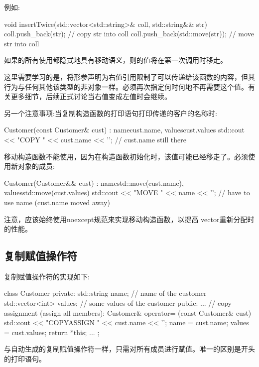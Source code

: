 例如:

\begin{cppcode}
void insertTwice(std::vector<std::string>& coll, std::string&& str)
{
	coll.push_back(str); // copy str into coll
	coll.push_back(std::move(str)); // move str into coll
}
\end{cppcode}

如果的所有使用都隐式地具有移动语义，则的值将在第一次调用时移走。

这里需要学习的是，将形参声明为右值引用限制了可以传递给该函数的内容，但其行为与任何其他该类型的非对象一样。必须再次指定何时何地不再需要这个值。有关更多细节，后续正式讨论当右值变成左值时会继续。

另一个注意事项:当复制构造函数的打印语句打印传递的客户的名称时:

\begin{cppcode}
Customer(const Customer& cust)
: name{cust.name}, values{cust.values} {
	std::cout << "COPY " << cust.name << '\n'; // cust.name still there
}
\end{cppcode}

移动构造函数不能使用，因为在构造函数初始化时，该值可能已经移走了。必须使用新对象的成员:

\begin{cppcode}
Customer(Customer&& cust)
: name{std::move(cust.name)}, values{std::move(cust.values)} {
	std::cout << "MOVE " << name << '\n'; // have to use name (cust.name moved away)
}
\end{cppcode}

注意，应该始终使用noexcept规范来实现移动构造函数，以提高 vector重新分配时的性能。

\subsection{复制赋值操作符}

复制赋值操作符的实现如下:

\begin{cppcode}
class Customer {
	private:
	std::string name; // name of the customer
	std::vector<int> values; // some values of the customer
	public:
	...
	// copy assignment (assign all members):
	Customer& operator= (const Customer& cust) {
		std::cout << "COPYASSIGN " << cust.name << '\n';
		name = cust.name;
		values = cust.values;
		return *this;
	}
...
};
\end{cppcode}

与自动生成的复制赋值操作符一样，只需对所有成员进行赋值。唯一的区别是开头的打印语句。

